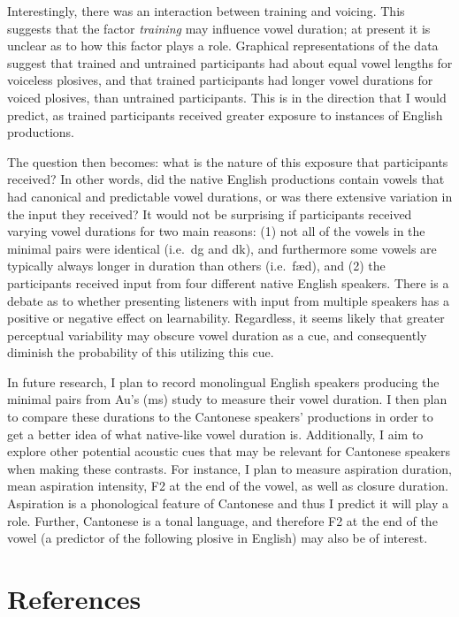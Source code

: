 \documentclass[man]{apa6}
\theoremstyle{definition}
\theoremstyle{definition}
\theoremstyle{definition}
\theoremstyle{remark}
\begin{document}
Interestingly, there was an interaction between training and voicing.
This suggests that the factor \emph{training} may influence vowel
duration; at present it is unclear as to how this factor plays a role.
Graphical representations of the data suggest that trained and untrained
participants had about equal vowel lengths for voiceless plosives, and
that trained participants had longer vowel durations for voiced
plosives, than untrained participants. This is in the direction that I
would predict, as trained participants received greater exposure to
instances of English productions.

The question then becomes: what is the nature of this exposure that
participants received? In other words, did the native English
productions contain vowels that had canonical and predictable vowel
durations, or was there extensive variation in the input they received?
It would not be surprising if participants received varying vowel
durations for two main reasons: (1) not all of the vowels in the minimal
pairs were identical (i.e.~d\textopeno g and d\textscripta k), and
furthermore some vowels are typically always longer in duration than
others (i.e.~f\ae d), and (2) the participants received input from four
different native English speakers. There is a debate as to whether
presenting listeners with input from multiple speakers has a positive or
negative effect on learnability. Regardless, it seems likely that
greater perceptual variability may obscure vowel duration as a cue, and
consequently diminish the probability of this utilizing this cue.

In future research, I plan to record monolingual English speakers
producing the minimal pairs from Au's (ms) study to measure their vowel
duration. I then plan to compare these durations to the Cantonese
speakers' productions in order to get a better idea of what native-like
vowel duration is. Additionally, I aim to explore other potential
acoustic cues that may be relevant for Cantonese speakers when making
these contrasts. For instance, I plan to measure aspiration duration,
mean aspiration intensity, F2 at the end of the vowel, as well as
closure duration. Aspiration is a phonological feature of Cantonese and
thus I predict it will play a role. Further, Cantonese is a tonal
language, and therefore F2 at the end of the vowel (a predictor of the
following plosive in English) may also be of interest.

\newpage

\section{References}\label{references}
\end{document}
